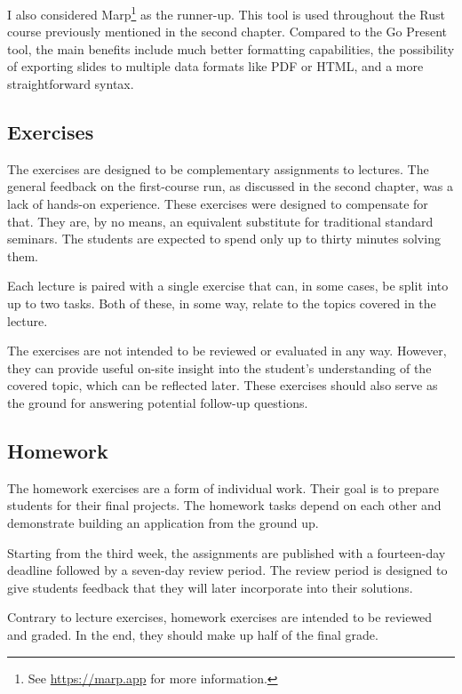 \documentclass[
  digital,
  color,
  oneside,
  nosansbold,
  nocolorbold,
  lof,
  lot,
]{fithesis4}
\begin{document}
I also considered Marp\footnote{See \url{https://marp.app} for more information.}
as the runner-up. This tool is used throughout the Rust course previously mentioned in the second chapter. Compared to the Go Present tool, the main benefits include much better formatting capabilities, the possibility of exporting slides to multiple data formats like PDF or HTML, and a more straightforward syntax.

\subsection{Exercises}

The exercises are designed to be complementary assignments to lectures. The general feedback on the first-course run, as discussed in the second chapter, was a lack of hands-on experience. These exercises were designed to compensate for that. They are, by no means, an equivalent substitute for traditional standard seminars. The students are expected to spend only up to thirty minutes solving them.

Each lecture is paired with a single exercise that can, in some cases, be split into up to two tasks. Both of these, in some way, relate to the topics covered in the lecture.

The exercises are not intended to be reviewed or evaluated in any way. However, they can provide useful on-site insight into the student's understanding of the covered topic, which can be reflected later. These exercises should also serve as the ground for answering potential follow-up questions.

\subsection{Homework}

The homework exercises are a form of individual work. Their goal is to prepare students for their final projects. The homework tasks depend on each other and demonstrate building an application from the ground up.

Starting from the third week, the assignments are published with a fourteen-day deadline followed by a seven-day review period. The review period is designed to give students feedback that they will later incorporate into their solutions.

Contrary to lecture exercises, homework exercises are intended to be reviewed and graded. In the end, they should make up half of the final grade.
\end{document}
